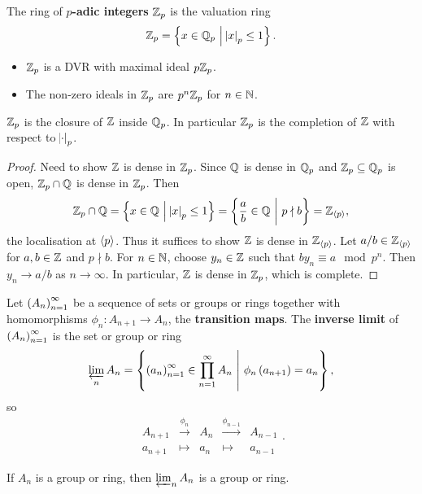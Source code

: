 \begin{definition}
The ring of \textbf{$ p $-adic integers} $ \mathbb{Z}_p $ is the valuation ring
$$ \ZZ_p = \cbr{x \in \QQ_p \st \abs{x}_p \le 1}. $$
\end{definition}

\begin{fact*}
\hfill
\begin{itemize}
\item $ \mathbb{Z}_p $ is a DVR with maximal ideal $ p\mathbb{Z}_p $.
\item The non-zero ideals in $ \mathbb{Z}_p $ are $ p^n\mathbb{Z}_p $ for $ n \in \mathbb{N} $.
\end{itemize}
\end{fact*}

\begin{proposition}
$ \mathbb{Z}_p $ is the closure of $ \mathbb{Z} $ inside $ \mathbb{Q}_p $. In particular $ \mathbb{Z}_p $ is the completion of $ \mathbb{Z} $ with respect to $ \abs{\cdot}_p $.
\end{proposition}

\begin{proof}
Need to show $ \mathbb{Z} $ is dense in $ \mathbb{Z}_p $. Since $ \mathbb{Q} $ is dense in $ \mathbb{Q}_p $ and $ \mathbb{Z}_p \subseteq \mathbb{Q}_p $ is open, $ \mathbb{Z}_p \cap \mathbb{Q} $ is dense in $ \mathbb{Z}_p $. Then
$$ \ZZ_p \cap \QQ = \cbr{x \in \QQ \st \abs{x}_p \le 1} = \cbr{\dfrac{a}{b} \in \QQ \st p \nmid b} = \ZZ_{\abr{p}}, $$
the localisation at $ \left\langle p \right\rangle $. Thus it suffices to show $ \mathbb{Z} $ is dense in $ \mathbb{Z}_{\left\langle p \right\rangle} $. Let $ a / b \in \mathbb{Z}_{\left\langle p \right\rangle} $ for $ a, b \in \mathbb{Z} $ and $ p \nmid b $. For $ n \in \mathbb{N} $, choose $ y_n \in \mathbb{Z} $ such that $ by_n \equiv a \mod p^n $. Then $ y_n \to a / b $ as $ n \to \infty $. In particular, $ \mathbb{Z} $ is dense in $ \mathbb{Z}_p $, which is complete.
\end{proof}

Let $ \br{A_n}_{n = 1}^\infty $ be a sequence of sets or groups or rings together with homomorphisms $ \phi_n : A_{n + 1} \to A_n $, the \textbf{transition maps}. The \textbf{inverse limit} of $ \br{A_n}_{n = 1}^\infty $ is the set or group or ring
$$ \varprojlim_n A_n = \cbr{\br{a_n}_{n = 1}^\infty \in \prod_{n = 1}^\infty A_n \st \phi_n\br{a_{n + 1}} = a_n}, $$
so
$$
\begin{array}{ccccc}
A_{n + 1} & \xrightarrow{\phi_n} & A_n & \xrightarrow{\phi_{n - 1}} & A_{n - 1} \\
a_{n + 1} & \longmapsto & a_n & \longmapsto & a_{n - 1}
\end{array}.
$$

\begin{fact*}
If $ A_n $ is a group or ring, then $ \varprojlim_n A_n $ is a group or ring.
\end{fact*}

